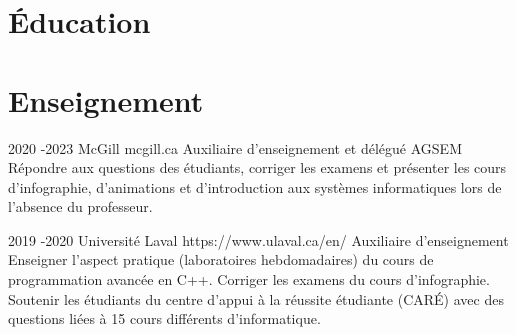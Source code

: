 \documentclass[10pt]{article} %
\begin{document}

\section{Éducation}






\section{Enseignement}


\job
{2020 -}{2023}
{McGill}
{mcgill.ca}
{Auxiliaire d'enseignement et délégué AGSEM}
{Répondre aux questions des étudiants, corriger les examens et présenter les cours d'infographie,
d'animations et d'introduction aux systèmes informatiques lors de l'absence du professeur.}

\job
{2019 -}{2020}
{Université Laval}
{https://www.ulaval.ca/en/}
{Auxiliaire d'enseignement}
{Enseigner l'aspect pratique (laboratoires hebdomadaires) du cours de programmation avancée en C++. Corriger les examens du cours d'infographie. Soutenir les étudiants du centre d'appui à la réussite étudiante (CARÉ) avec des questions liées à 15 cours différents d'informatique.}
\end{document}

